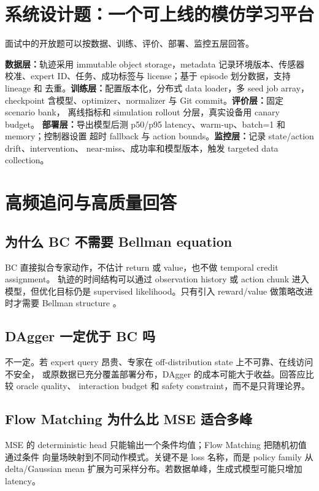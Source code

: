 \documentclass[10pt,twocolumn,a4paper]{ctexart}
\begin{document}
\section{系统设计题：一个可上线的模仿学习平台}
面试中的开放题可以按数据、训练、评价、部署、监控五层回答。

\textbf{数据层：}轨迹采用 immutable object storage，metadata 记录环境版本、传感器
校准、expert ID、任务、成功标签与 license；基于 episode 划分数据，支持 lineage 和
去重。\textbf{训练层：}配置版本化，分布式 data loader，多 seed job array，checkpoint
含模型、optimizer、normalizer 与 Git commit。\textbf{评价层：}固定 scenario bank，
离线指标和 simulation rollout 分层，真实设备用 canary budget。
\textbf{部署层：}导出模型后测 p50/p95 latency、warm-up、batch=1 和 memory；控制器设置
超时 fallback 与 action bounds。\textbf{监控层：}记录 state/action drift、intervention、
near-miss、成功率和模型版本，触发 targeted data collection。

\section{高频追问与高质量回答}
\subsection{为什么 BC 不需要 Bellman equation}
BC 直接拟合专家动作，不估计 return 或 value，也不做 temporal credit assignment。
轨迹的时间结构可以通过 observation history 或 action chunk 进入模型，但优化目标仍是
supervised likelihood。只有引入 reward/value 做策略改进时才需要 Bellman structure
\citep{sutton2018rl}。

\subsection{DAgger 一定优于 BC 吗}
不一定。若 expert query 昂贵、专家在 off-distribution state 上不可靠、在线访问不安全，
或原数据已充分覆盖部署分布，DAgger 的成本可能大于收益。回答应比较 oracle quality、
interaction budget 和 safety constraint，而不是只背理论界。

\subsection{Flow Matching 为什么比 MSE 适合多峰}
MSE 的 deterministic head 只能输出一个条件均值；Flow Matching 把随机初值通过条件
向量场映射到不同动作模式。关键不是 loss 名称，而是 policy family 从 delta/Gaussian
mean 扩展为可采样分布。若数据单峰，生成式模型可能只增加 latency。
\end{document}
